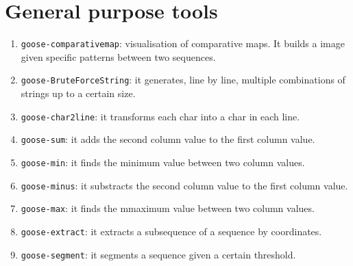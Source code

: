 \chapter{General purpose tools}
\label{seq}

\begin{enumerate}
\item \texttt{goose-comparativemap}: visualisation of comparative maps. It builds a image given specific patterns between two sequences.
\item \texttt{goose-BruteForceString}: it generates, line by line, multiple combinations of strings up to a certain size.
\item \texttt{goose-char2line}: it transforms each char into a char in each line.
\item \texttt{goose-sum}: it adds the second column value to the first column value.
\item \texttt{goose-min}: it finds the minimum value between two column values.
\item \texttt{goose-minus}: it substracts the second column value to the first column value.
\item \texttt{goose-max}: it finds the mmaximum value between two column values.
\item \texttt{goose-extract}: it extracts a subsequence of a sequence by coordinates.
\item \texttt{goose-segment}: it segments a sequence given a certain threshold.
\end{enumerate}